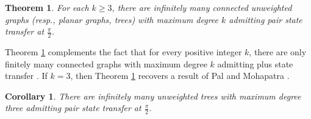 \documentclass[12pt,a4paper]{article}
\newtheorem{thm}{Theorem}
\newtheorem{cor}{Corollary}
\begin{document}
\begin{thm}
\label{inftreesmaxdeg3}
For each $k\geq 3$, there are infinitely many connected unweighted graphs (resp., planar graphs, trees) with maximum degree $k$ admitting pair state transfer at $\frac{\pi}{2}$.
\end{thm}

Theorem \ref{inftreesmaxdeg3} complements the fact that for every positive integer $k$, there are only finitely many connected graphs with maximum degree $k$ admitting plus state transfer \cite[Corollary 3.5]{kim}. If $k=3$, then Theorem \ref{inftreesmaxdeg3} recovers a result of Pal and Mohapatra \cite{pal10}.

\begin{cor}
\label{inftreesmaxdeg31}
There are infinitely many unweighted trees with maximum degree three admitting pair state transfer at $\frac{\pi}{2}$.
\end{cor}
\end{document}
